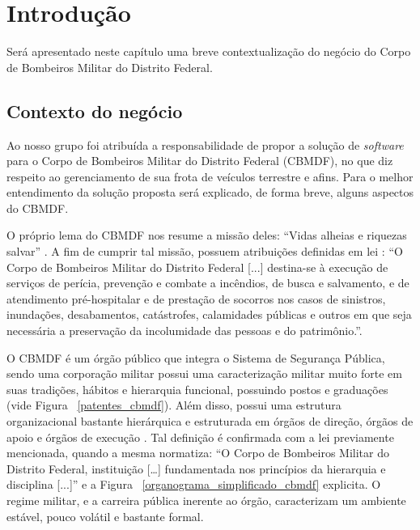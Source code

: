 \chapter[Introdução]{Introdução}
  
  Será apresentado neste capítulo uma breve contextualização do negócio do Corpo de Bombeiros Militar do Distrito Federal.
  
  \section{Contexto do negócio}
  
  Ao nosso grupo foi atribuída a responsabilidade de propor a solução de \textit{software} para o Corpo de Bombeiros Militar
  do Distrito Federal (CBMDF), no que diz respeito ao gerenciamento de sua frota de veículos terrestre e afins.
  Para o melhor entendimento da solução proposta será explicado, de forma breve, alguns aspectos do CBMDF.
  
  O próprio lema do CBMDF nos resume a missão deles: “Vidas alheias e riquezas salvar” \cite{cbmdf12}.
  A fim de cumprir tal missão, possuem atribuições definidas em lei \cite{brasil09}: “O Corpo de Bombeiros Militar do Distrito
  Federal [...] destina-se à execução de serviços de perícia, prevenção e combate a incêndios, de busca e salvamento, e
  de atendimento pré-hospitalar e de prestação de socorros nos casos de sinistros, inundações, desabamentos, catástrofes,
  calamidades públicas e outros em que seja necessária a preservação da incolumidade das pessoas e do patrimônio.”.
  
  O CBMDF é um órgão público que integra o Sistema de Segurança Pública, sendo uma corporação militar possui uma caracterização
  militar muito forte em suas tradições, hábitos e hierarquia funcional, possuindo postos e graduações (vide Figura ~\ref{patentes_cbmdf}).
  Além disso, possui uma estrutura organizacional bastante hierárquica e estruturada em órgãos de direção, órgãos de apoio
  e órgãos de execução \cite{brasil91}. Tal definição é confirmada com a lei previamente mencionada, quando a mesma normatiza:
  “O Corpo de Bombeiros Militar do Distrito Federal, instituição […] fundamentada nos princípios da hierarquia e disciplina [...]”
  e a Figura ~\ref{organograma_simplificado_cbmdf} explicita. O regime militar, e a carreira pública inerente ao órgão, caracterizam um ambiente estável,
  pouco volátil e bastante formal.
  

